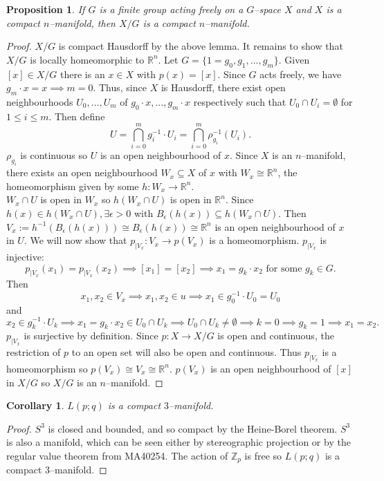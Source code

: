 \documentclass{article}
\newtheorem{proposition}[theorem]{Proposition}
\newtheorem{corollary}[theorem]{Corollary}
\begin{document}
\begin{proposition}
If $G$ is a finite group acting freely on a $G$--space $X$ and $X$ is a compact $n$--manifold, then $X/G$ is a compact $n$--manifold.
\end{proposition}
\begin{proof}
$X/G$ is compact Hausdorff by the above lemma. It remains to show that $X/G$ is locally homeomorphic to $\mathbb{R}^n$. Let $G=\{1=g_0,g_1,...,g_m\}$. Given $[x]\in X/G$ there is an $x\in X$ with $p(x)=[x]$. Since $G$ acts freely, we have $g_m\cdot x=x\implies m=0$. Thus, since $X$ is Hausdorff, there exist open neighbourhoods $U_0,...,U_m$ of $g_0\cdot x,...,g_m\cdot x$ respectively such that $U_0\cap U_i=\emptyset$ for $1\leq i\leq m$. Then define \[U=\bigcap_{i=0}^mg_i^{-1}\cdot U_i=\bigcap_{i=0}^m\rho_{g_i}^{-1}(U_i).\] $\rho_{g_i}$ is continuous so $U$ is an open neighbourhood of $x$. Since $X$ is an $n$--manifold, there exists an open neighbourhood $W_x\subseteq X$ of $x$ with $W_x\cong\mathbb{R}^n$, the homeomorphism given by some $h:W_x\to \mathbb{R}^n$.\\ $W_x\cap U$ is open in $W_x$ so $h(W_x\cap U)$ is open in $\mathbb{R}^n$. Since $h(x)\in h(W_x\cap U),\exists\epsilon>0$ with $B_\epsilon(h(x))\subseteq h(W_x\cap U)$. Then $V_x:=h^{-1}(B_\epsilon (h(x)))\cong B_\epsilon(h(x))\cong\mathbb{R}^n$ is an open neighbourhood of $x$ in $U$. We will now show that $p_{|V_x}:V_x\to p(V_x)$ is a homeomorphism. $p_{|V_x}$ is injective: \[p_{|V_x}(x_1)=p_{|V_x}(x_2)\implies[x_1]=[x_2]\implies x_1=g_k\cdot x_2\text{ for some }g_k\in G.\] Then \[x_1,x_2\in V_x\implies x_1,x_2\in u\implies x_1\in g_0^{-1}\cdot U_0=U_0\] and \[x_2\in g_k^{-1}\cdot U_k\implies x_1=g_k\cdot x_2\in U_0\cap U_k\implies U_0\cap U_k\neq \emptyset\implies k=0\implies g_k=1\implies x_1=x_2.\]
$p_{|V_x}$ is surjective by definition. Since $p:X\to X/G$ is open and continuous, the restriction of $p$ to an open set will also be open and continuous. Thus $p_{|V_x}$ is a homeomorphism so $p(V_x)\cong V_x\cong\mathbb{R}^n$. $p(V_x)$ is an open neighbourhood of $[x]$ in $X/G$ so $X/G$ is an $n$--manifold.
\end{proof}
\begin{corollary}
$L(p;q)$ is a compact $3$--manifold.
\end{corollary}
\begin{proof}
$S^3$ is closed and bounded, and so compact by the Heine-Borel theorem. $S^3$ is also a manifold, which can be seen either by stereographic projection or by the regular value theorem from MA40254. The action of $\mathbb{Z}_p$ is free so $L(p;q)$ is a compact $3$--manifold.
\end{proof}
\end{document}
